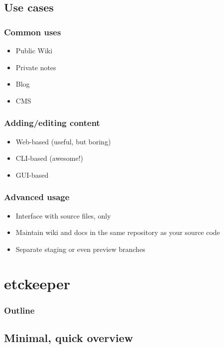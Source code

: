 \documentclass[t]{beamer}
\begin{document}
\subsection{Use cases}

\begin{frame}
	\frametitle{Common uses}
	\begin{itemize}
		\item Public Wiki
		\item Private notes
		\item Blog
		\item CMS
	\end{itemize}
\end{frame}

\begin{frame}
	\frametitle{Adding/editing content}
	\begin{itemize}
		\item Web-based (useful, but boring)
		\item CLI-based (awesome!)
		\item GUI-based
	\end{itemize}
\end{frame}

\begin{frame}
	\frametitle{Advanced usage}
	\begin{itemize}
		\item Interface with source files, only
		\item Maintain wiki and docs in the same repository as your source code
		\item Separate staging or even preview branches
	\end{itemize}
\end{frame}

\section{etckeeper}

\begin{frame}
	\frametitle{Outline}
	\tableofcontents[currentsection]
\end{frame}

\subsection{Minimal, quick overview}
\end{document}
